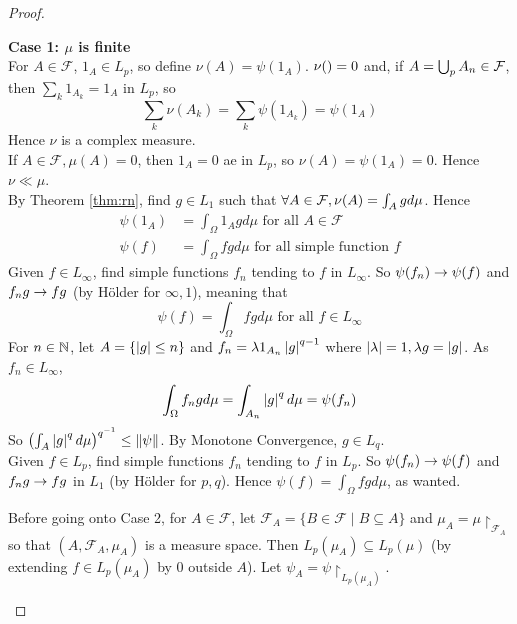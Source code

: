 \documentclass{article}
\begin{document}
\begin{proof}
\begin{enumerate}
    {\bf Case 1: $\mu$ is finite} \\
    For $A \in \mathcal F$, $1_A \in L_p$, so define $\nu(A) = \psi(1_A)$. $\nu(\empty) = 0$ and, if $A = \bigcup_p A_n \in \mathcal F$, then $\sum_k 1_{A_k} = 1_A$ in $L_p$, so
    $$\sum_k \nu(A_k) = \sum_k \psi(1_{A_k}) = \psi(1_A)$$
    Hence $\nu$ is a complex measure. \\
    If $A \in \mathcal F, \mu(A) = 0$, then $1_A = 0$ ae in $L_p$, so $\nu(A) = \psi(1_A) = 0$. Hence $\nu \ll \mu$. \\
    By Theorem \ref{thm:rn}, find $g \in L_1$ such that $\forall A \in \mathcal F, \nu(A) = \int_A g d\mu$. Hence
    \begin{align*}
      \psi(1_A) & = \int_\Omega 1_A g d\mu \text{ for all } A \in \mathcal F \\
      \psi(f) & = \int_\Omega fg d\mu \text{ for all simple function } f
    \end{align*}
    Given $f \in L_\infty$, find simple functions $f_n$ tending to $f$ in $L_\infty$. So $\psi(f_n) \rightarrow \psi(f)$ and $f_ng \rightarrow fg$ (by Hölder for $\infty, 1$), meaning that
    $$\psi(f) = \int_\Omega fg d\mu \text{ for all } f \in L_\infty$$
    For $n \in \mathbb N$, let $A = \{\left\lvert g\right\rvert \le n\}$ and $f_n = \lambda 1_{A_n} \left\lvert g\right\rvert^{q - 1}$ where $\left\lvert \lambda\right\rvert = 1, \lambda g = \left\lvert g\right\rvert$. As $f_n \in L_\infty$,
    $$\int_\Omega f_ng d\mu = \int_{A_n} \left\lvert g\right\rvert^q d\mu = \psi(f_n)$$
    So $\left(\int_A \left\lvert g\right\rvert^q d\mu\right)^{q^{-1}} \le \left\lVert \psi\right\rVert$. By Monotone Convergence, $g \in L_q$. \\
    Given $f \in L_p$, find simple functions $f_n$ tending to $f$ in $L_p$. So $\psi(f_n) \rightarrow \psi(f)$ and $f_ng \rightarrow fg$ in $L_1$ (by Hölder for $p, q$). Hence $\psi(f) = \int_\Omega fg d\mu$, as wanted.

    Before going onto Case 2, for $A \in \mathcal F$, let $\mathcal F_A = \{B \in \mathcal F \mid B \subseteq A\}$ and $\mu_A = \mu\restriction_{\mathcal F_A}$ so that $(A, \mathcal F_A, \mu_A)$ is a measure space. Then $L_p(\mu_A) \subseteq L_p(\mu)$ (by extending $f \in L_p(\mu_A)$ by $0$ outside $A$). Let $\psi_A = \psi\restriction_{L_p(\mu_A)}$.

    \newlec


\end{enumerate}
\end{proof}
\end{document}
